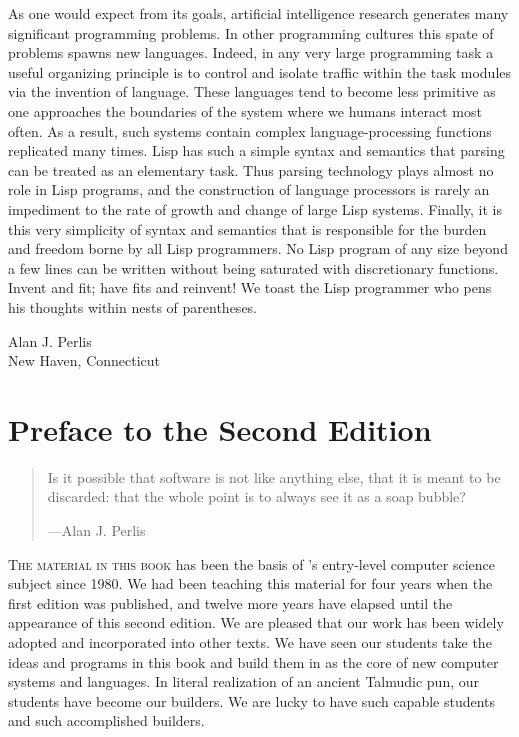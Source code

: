 As one would expect from its goals, artificial intelligence research generates many significant programming problems.
In other programming cultures this spate of problems spawns new languages.
Indeed, in any very large programming task a useful organizing principle is to control and isolate traffic within the task modules via the invention of language.
These languages tend to become less primitive as one approaches the boundaries of the system where we humans interact most often.
As a result, such systems contain complex language-processing functions replicated many times.
Lisp has such a simple syntax and semantics that parsing can be treated as an elementary task.
Thus parsing technology plays almost no role in Lisp programs, and the construction of language processors is rarely an impediment to the rate of growth and change of large Lisp systems.
Finally, it is this very simplicity of syntax and semantics that is responsible for the burden and freedom borne by all Lisp programmers.
No Lisp program of any size beyond a few lines can be written without being saturated with discretionary functions.
Invent and fit;
have fits and reinvent!
We toast the Lisp programmer who pens his thoughts within nests of parentheses.

\vspace{0.5em}
\noindent
Alan J. Perlis\\
New Haven, Connecticut

\chapter*{Preface to the Second Edition}
\label{Preface}

\begin{quote}
Is it possible that software is not like anything else, that it is meant to be discarded:
that the whole point is to always see it as a soap bubble?

---Alan J. Perlis
\end{quote}


\noindent
\lettrine{T}{he material in this book} has been the basis of ’s entry-level computer science subject since 1980.
We had been teaching this material for four years when the first edition was published, and twelve more years have elapsed until the appearance of this second edition.
We are pleased that our work has been widely adopted and incorporated into other texts.
We have seen our students take the ideas and programs in this book and build them in as the core of new computer systems and languages.
In literal realization of an ancient Talmudic pun, our students have become our builders.
We are lucky to have such capable students and such accomplished builders.

